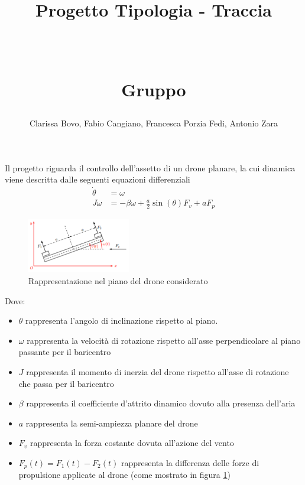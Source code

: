 \documentclass[a4paper, 11pt]{article}
\title{ \vspace{-1in}
		\huge \strut \coursename \strut 
		\\
		\Large  \strut Progetto Tipologia \tipology - Traccia \trace 
		\\
		\Large  \strut \projectname\strut
		\\
		\Large  \strut Gruppo \group\strut
		\vspace{-0.4cm}
}
\author{Clarissa Bovo, Fabio Cangiano, Francesca Porzia Fedi, Antonio Zara}
\date{}
\begin{document}
\maketitle
\vspace{-0.5cm}

Il progetto riguarda il controllo dell'assetto di un drone planare, la cui dinamica viene descritta dalle seguenti equazioni differenziali 
%
\begin{subequations}\label{eq:system}
\begin{align}
	\dot{\theta}&=\omega \\
    J\dot{\omega}&=-\beta\omega+\frac{a}{2}\sin{(\theta)}F_v+a F_p
\end{align}
\end{subequations}
%

\begin{figure}[H]
    \centering
    \includegraphics[width=0.4\textwidth]{immagini/figura_drone.png}
    \caption{Rappresentazione nel piano del drone considerato}
    \label{fig:figura_drone}
\end{figure}

Dove:
\begin{itemize}
    \item $\theta$ rappresenta l'angolo di inclinazione rispetto al piano.
    \item $\omega$ rappresenta la velocità di rotazione rispetto all’asse perpendicolare
al piano passante per il baricentro
    \item $J$ rappresenta il momento di inerzia del drone rispetto all’asse di
rotazione che passa per il baricentro
    \item $\beta$ rappresenta il coefficiente d’attrito dinamico dovuto alla presenza
dell’aria
    \item $a$ rappresenta la semi-ampiezza planare del drone
    \item $F_v$ rappresenta la forza costante dovuta all’azione del vento
    \item $F_p(t)=F_1(t)-F_2(t)$ rappresenta la differenza delle forze di propulsione applicate al drone (come mostrato in figura \ref{fig:figura_drone})
\end{itemize}
\end{document}
